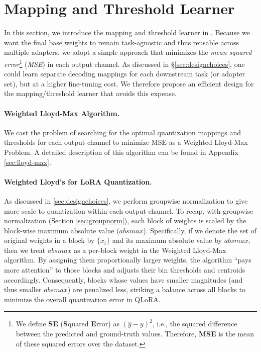 \section{Mapping and Threshold Learner} \label{sec:learner}


In this section, we introduce the mapping and threshold learner in \FWName. Because we want the final base weights to remain task-agnostic and thus reusable across multiple adapters, we adopt a simple approach that minimizes the \emph{mean squared error}\footnote{We define \textbf{SE} (\textbf{S}quared \textbf{E}rror) as 
  $(\hat{y} - y)^2$, i.e., the squared difference between the predicted 
  and ground-truth values. Therefore, \textbf{MSE} is the mean of these 
  squared errors over the dataset.} (\emph{MSE}) in each output channel. As discussed in \S\ref{sec:designchoices}, one could learn separate decoding mappings for each downstream task (or adapter set), but at a higher fine-tuning cost. We therefore propose an efficient design for the mapping/threshold learner that avoids this expense.

\paragraph{Weighted Lloyd-Max Algorithm.}

We cast the problem of searching for the optimal quantization mappings and thresholds for each output channel to minimize MSE as a Weighted Lloyd-Max Problem. 
A detailed description of this algorithm can be found in Appendix \ref{sec:lloyd-max}.

\paragraph{Weighted Lloyd's for LoRA Quantization.}
As discussed in \ref{sec:designchoices}, we perform groupwise normalization to give more scale to quantization within each output channel. To recap, with groupwise normalization (Section \ref{sec:groupnorm}), each block of weights is scaled by the block-wise maximum absolute value ($absmax$).  Specifically, if we denote the set of original weights in a block by \(\{ x_i \}\)  and its maximum absolute value by $absmax$, then we treat $absmax$ as a per-block weight in the Weighted Lloyd-Max algorithm. By assigning them proportionally larger weights, the algorithm ``pays more attention'' to those blocks and adjusts their bin thresholds and centroids accordingly. Consequently, blocks whose values have smaller magnitudes (and thus smaller $absmax$) are penalized less, striking a balance across all blocks to minimize the overall quantization error in QLoRA.

